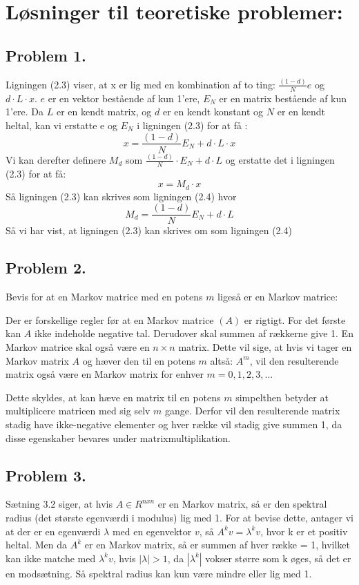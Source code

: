 
\section{Løsninger til teoretiske problemer:}


\subsection*{Problem 1.}

Ligningen (2.3) viser, at x er lig med en kombination af to ting: $\frac{(1-d)}{N}e$ og $d\cdot L\cdot x$. $e$ er en vektor bestående af kun 1'ere, $E_N$ er en matrix bestående af kun 1'ere.
Da $L$ er en kendt matrix, og $d$ er en kendt konstant og $N$ er en kendt heltal, kan vi erstatte e og $E_N$ i ligningen (2.3) for at få :
$$x = \frac{(1-d)}{N}E_N + d\cdot L\cdot x$$
Vi kan derefter definere $M_d$ som $\frac{(1-d)}{N} \cdot E_N + d \cdot L$ og erstatte det i ligningen (2.3) for at få:
$$x = M_d \cdot x$$
Så ligningen (2.3) kan skrives som ligningen (2.4) hvor $$M_d = \frac{(1-d)}{N}E_N + d \cdot L$$
Så vi har vist, at ligningen (2.3) kan skrives om som ligningen (2.4)



\subsection*{Problem 2.}

Bevis for at en Markov matrice med en potens $m$ ligeså er en Markov matrice:

Der er forskellige regler før at en Markov matrice $(A)$ er rigtigt. For det første kan $A$ ikke indeholde negative tal. Derudover skal summen af rækkerne give 1. En Markov matrice skal også være en $n \times n$ matrix. Dette vil sige, at hvis vi tager en Markov matrix $A$ og hæver den til en potens $m$ altså: $A^m$, vil den resulterende matrix også være en Markov matrix for enhver $m = 0,1,2,3,...$

Dette skyldes, at kan hæve en matrix til en potens $m$ simpelthen betyder at multiplicere matricen med sig selv $m$ gange. Derfor vil den resulterende matrix stadig have ikke-negative elementer og hver række vil stadig give summen 1, da disse egenskaber bevares under matrixmultiplikation.

\subsection*{Problem 3.}

Sætning 3.2 siger, at hvis $A \in R^{nxn}$ er en Markov matrix, så er den spektral radius (det største egenværdi i modulus) lig med 1. For at bevise dette, antager vi at der er en egenværdi $\lambda$ med en egenvektor $v$, så $A^kv = \lambda^kv$, hvor k er et positiv heltal. Men da $A^k$ er en Markov matrix, så er summen af hver række = 1, hvilket kan ikke matche med $\lambda^kv$, hvis $|\lambda| > 1$, da $|\lambda^k|$ vokser større som k øges, så det er en modsætning. Så spektral radius kan kun være mindre eller lig med 1.

